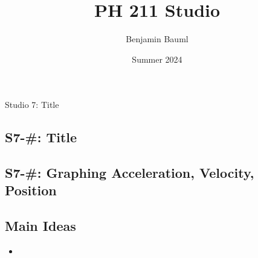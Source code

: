 \documentclass[]{article}
\title{PH 211 Studio \Week}
\author{Benjamin Bauml}
\date{Summer 2024}
\begin{document}
\begin{TeacherMargin}

\end{TeacherMargin}
\begin{PresentSpace}
\begin{center}
	\huge Studio 7: Title \\
	\vspace{1cm}
\end{center}
\begin{comment}{2}
\begin{enumerate}[(A)]
	\item Velocity is acceleration times $t$.
	\vspace{6pt}
	\item Acceleration is velocity times $t$.
	\vspace{15pt}
	\item Acceleration is the derivative of velocity.
	\item Velocity is the derivative of acceleration.
\end{enumerate}
\end{comment}
\end{PresentSpace}
\newpage
\begin{TeacherMargin}

\end{TeacherMargin}
\begin{PresentSpace}
\vspace{-10pt}
\section*{S7-#: Title}
\vspace{-10pt}

\end{PresentSpace}
\newpage
\begin{TeacherMargin}

\end{TeacherMargin}
\begin{PresentSpace}
\vspace{-10pt}
\section*{S7-#: Graphing Acceleration, Velocity, Position}
\vspace{-10pt}

\end{PresentSpace}
\newpage
\begin{TeacherMargin}

\end{TeacherMargin}
\begin{PresentSpace}
\section*{Main Ideas}
\begin{itemize}
	\item 
\end{itemize}
\end{PresentSpace}
\end{document}
